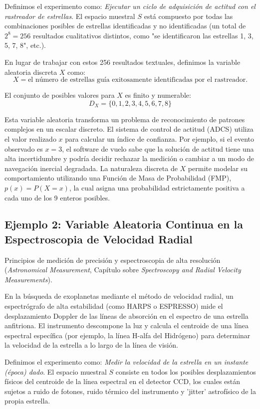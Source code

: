 Definimos el experimento como: \textit{Ejecutar un ciclo de adquisición de actitud con el rastreador de estrellas}.
El espacio muestral $S$ está compuesto por todas las combinaciones posibles de estrellas identificadas y no identificadas (un total de $2^8 = 256$ resultados cualitativos distintos, como "se identificaron las estrellas 1, 3, 5, 7, 8", etc.).

En lugar de trabajar con estos 256 resultados textuales, definimos la variable aleatoria discreta $X$ como:
$$ X = \text{el número de estrellas guía exitosamente identificadas por el rastreador.} $$

El conjunto de posibles valores para $X$ es finito y numerable:
$$ D_X = \{0, 1, 2, 3, 4, 5, 6, 7, 8\} $$

Esta variable aleatoria transforma un problema de reconocimiento de patrones complejos en un escalar discreto. El sistema de control de actitud (ADCS) utiliza el valor realizado $x$ para calcular un índice de confianza. Por ejemplo, si el evento observado es $x = 3$, el software de vuelo sabe que la solución de actitud tiene una alta incertidumbre y podría decidir rechazar la medición o cambiar a un modo de navegación inercial degradada. La naturaleza discreta de $X$ permite modelar su comportamiento utilizando una Función de Masa de Probabilidad (FMP), $p(x) = P(X = x)$, la cual asigna una probabilidad estrictamente positiva a cada uno de los 9 enteros posibles.

\subsection{Ejemplo 2: Variable Aleatoria Continua en la Espectroscopia de Velocidad Radial}

Principios de medición de precisión y espectroscopia de alta resolución (\textit{Astronomical Measurement}, Capítulo sobre \textit{Spectroscopy and Radial Velocity Measurements}).

En la búsqueda de exoplanetas mediante el método de velocidad radial, un espectrógrafo de alta estabilidad (como HARPS o ESPRESSO) mide el desplazamiento Doppler de las líneas de absorción en el espectro de una estrella anfitriona. El instrumento descompone la luz y calcula el centroide de una línea espectral específica (por ejemplo, la línea H-alfa del Hidrógeno) para determinar la velocidad de la estrella a lo largo de la línea de visión.

Definimos el experimento como: \textit{Medir la velocidad de la estrella en un instante (época) dado}.
El espacio muestral $S$ consiste en todos los posibles desplazamientos físicos del centroide de la línea espectral en el detector CCD, los cuales están sujetos a ruido de fotones, ruido térmico del instrumento y 'jitter' astrofísico de la propia estrella.

